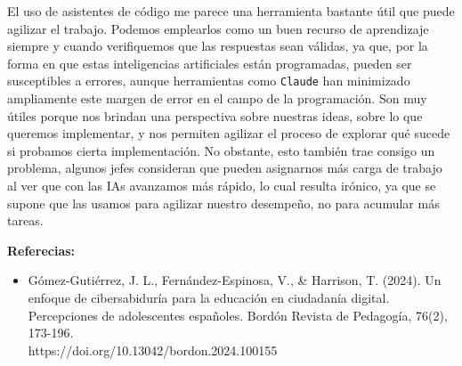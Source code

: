\documentclass[12pt,letterpaper]{article}
\begin{document}
El uso de asistentes de código me parece una herramienta bastante útil que puede agilizar el trabajo. Podemos emplearlos como un buen recurso de aprendizaje siempre y cuando verifiquemos que las respuestas sean válidas, ya que, por la forma en que estas inteligencias artificiales están programadas, pueden ser susceptibles a errores, aunque herramientas como \texttt{Claude} han minimizado ampliamente este margen de error en el campo de la programación. Son muy útiles porque nos brindan una perspectiva sobre nuestras ideas, sobre lo que queremos implementar, y nos permiten agilizar el proceso de explorar qué sucede si probamos cierta implementación. No obstante, esto también trae consigo un problema, algunos jefes consideran que pueden asignarnos más carga de trabajo al ver que con las IAs avanzamos más rápido, lo cual resulta irónico, ya que se supone que las usamos para agilizar nuestro desempeño, no para acumular más tareas.\\

\newpage

\textbf{Referecias:}\\

\begin{itemize}
\item Gómez-Gutiérrez, J. L., Fernández-Espinosa, V., \& Harrison, T. (2024). Un enfoque de cibersabiduría para la educación en ciudadanía digital. Percepciones de adolescentes españoles. Bordón Revista de Pedagogía, 76(2), 173-196.\\ https://doi.org/10.13042/bordon.2024.100155
\end{itemize}
\end{document}
